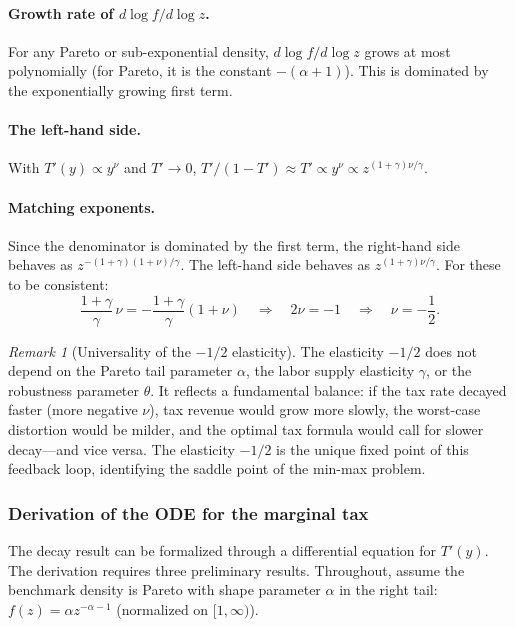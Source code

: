 \documentclass[12pt,a4paper]{article}
\theoremstyle{definition}
\theoremstyle{plain}
\theoremstyle{remark}
\newtheorem{remark}{Remark}[section]
\begin{document}
\paragraph{Growth rate of $d\log f/d\log z$.}
For any Pareto or sub-exponential density, $d\log f/d\log z$ grows at most polynomially (for Pareto, it is the constant $-(\alpha+1)$). This is dominated by the exponentially growing first term.

\paragraph{The left-hand side.}
With $T'(y) \propto y^\nu$ and $T' \to 0$, $T'/(1-T') \approx T' \propto y^\nu \propto z^{(1+\gamma)\nu/\gamma}$.

\paragraph{Matching exponents.}
Since the denominator is dominated by the first term, the right-hand side behaves as $z^{-(1+\gamma)(1+\nu)/\gamma}$. The left-hand side behaves as $z^{(1+\gamma)\nu/\gamma}$. For these to be consistent:
\[
  \frac{1+\gamma}{\gamma}\, \nu = -\frac{1+\gamma}{\gamma}(1+\nu)
  \quad \Longrightarrow \quad 2\nu = -1
  \quad \Longrightarrow \quad \nu = -\frac{1}{2}.
\]

\begin{remark}[Universality of the $-1/2$ elasticity]
\label{rem:universal_half}
The elasticity $-1/2$ does not depend on the Pareto tail parameter $\alpha$, the labor supply elasticity $\gamma$, or the robustness parameter $\theta$. It reflects a fundamental balance: if the tax rate decayed faster (more negative $\nu$), tax revenue would grow more slowly, the worst-case distortion would be milder, and the optimal tax formula would call for slower decay---and vice versa. The elasticity $-1/2$ is the unique fixed point of this feedback loop, identifying the saddle point of the min-max problem.
\end{remark}

\subsubsection{Derivation of the ODE for the marginal tax}

The decay result can be formalized through a differential equation for $T'(y)$. The derivation requires three preliminary results. Throughout, assume the benchmark density is Pareto with shape parameter $\alpha$ in the right tail: $f(z) = \alpha z^{-\alpha-1}$ (normalized on $[1,\infty)$).
\end{document}
